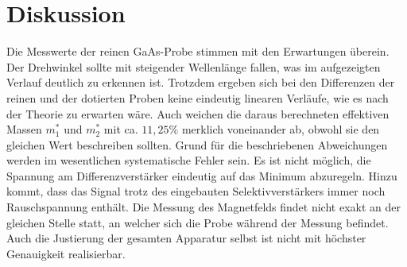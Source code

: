\section{Diskussion}
\label{sec:Diskussion}
Die Messwerte der reinen GaAs-Probe stimmen mit den Erwartungen überein. Der
Drehwinkel sollte mit steigender Wellenlänge fallen, was im aufgezeigten Verlauf
deutlich zu erkennen ist. Trotzdem ergeben sich bei den Differenzen der reinen
und der dotierten Proben keine eindeutig linearen Verläufe, wie es nach der
Theorie zu erwarten wäre. Auch weichen die daraus berechneten effektiven Massen
$m^*_1$ und $m^*_2$ mit ca. $11,25\%$ merklich voneinander ab, obwohl sie den
gleichen Wert beschreiben sollten. Grund für die beschriebenen Abweichungen werden
im wesentlichen systematische Fehler sein. Es ist nicht möglich, die Spannung am
Differenzverstärker eindeutig auf das Minimum abzuregeln. Hinzu kommt, dass das Signal
trotz des eingebauten Selektivverstärkers immer noch Rauschspannung enthält. Die
Messung des Magnetfelds findet nicht exakt an der gleichen Stelle statt, an welcher
sich die Probe während der Messung befindet. Auch die Justierung
der gesamten Apparatur selbst ist nicht mit höchster Genauigkeit realisierbar.
